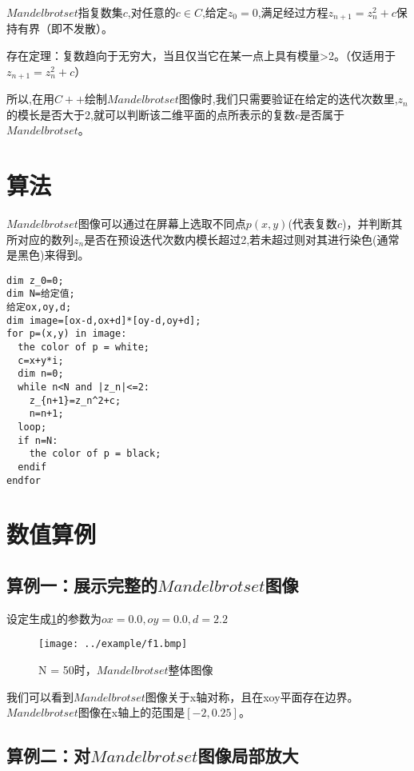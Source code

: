 \documentclass{ctexart}
\begin{document}
$Mandelbrot set$指复数集${c}$,对任意的$c\in C$,给定$z_0=0$,满足经过方程$z_{n+1}=z_n^2+c$保持有界（即不发散）。\par

存在定理：复数趋向于无穷大，当且仅当它在某一点上具有模量>2。（仅适用于$z_{n+1}=z_n^2+c$）\cite{acms2022,}\par

所以,在用$C++$绘制$Mandelbrot set$图像时,我们只需要验证在给定的迭代次数里,$z_n$的模长是否大于2,就可以判断该二维平面的点所表示的复数$c$是否属于$Mandelbrot set$。\par

\section{算法}

$Mandelbrot set$图像可以通过在屏幕上选取不同点$p(x,y)$(代表复数$c$)，并判断其所对应的数列${z_n}$是否在预设迭代次数内模长超过2,若未超过则对其进行染色(通常是黑色)来得到。

\begin{verbatim}
dim z_0=0;
dim N=给定值;
给定ox,oy,d;
dim image=[ox-d,ox+d]*[oy-d,oy+d];
for p=(x,y) in image:
  the color of p = white;
  c=x+y*i;
  dim n=0;
  while n<N and |z_n|<=2:
    z_{n+1}=z_n^2+c;
    n=n+1;
  loop;
  if n=N:
    the color of p = black;
  endif
endfor
\end{verbatim}

\section{数值算例}
\subsection{算例一：展示完整的$Mandelbrot set$图像}

设定生成\ref{g::01}的参数为$ox=0.0,oy=0.0,d=2.2$

\begin{figure}[ht]
  \centering
  \texttt{[image: ../example/f1.bmp]}
  \caption{N = 50时，$Mandelbrot set$整体图像}
  \label{g::01}
\end{figure}

我们可以看到$Mandelbrot set$图像关于x轴对称，且在xoy平面存在边界。$Mandelbrot set$图像在x轴上的范围是$[-2,0.25]$。

\subsection{算例二：对$Mandelbrot set$图像局部放大}
\end{document}
